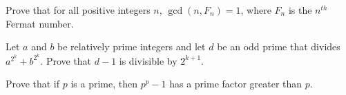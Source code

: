 \begin{problem}
	Prove that for all positive integers $n$, $\gcd(n, F_n) = 1$, where $F_n$ is the $n^{th}$ Fermat number. %
\end{problem}


\begin{problem}
	Let $a$ and $b$ be relatively prime integers and let $d$ be an odd prime that divides $a^{2^{k}}+b^{2^{k}}$. Prove that $d-1$ is divisible by $2^{k+1}$. %
\end{problem}

%

\begin{problem}
	Prove that if $p$ is a prime, then $p^p-1$ has a prime factor greater than $p$. %
\end{problem}


